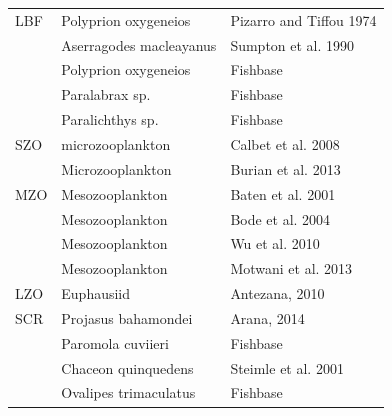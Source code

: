 \documentclass[11pt]{article}
\begin{document}
\begin{center}
\begin{tabular}{lll}
\hline
 LBF  &  Polyprion oxygeneios        &  Pizarro and Tiffou 1974                                                         \\
      &  Aserragodes macleayanus     &  Sumpton et al. 1990                                                             \\
      &  Polyprion oxygeneios        &  Fishbase                                                                        \\
      &  Paralabrax sp.              &  Fishbase                                                                        \\
      &  Paralichthys sp.            &  Fishbase                                                                        \\
\hline
 SZO  &  microzooplankton            &  Calbet et al. 2008                                                              \\
      &  Microzooplankton            &  Burian et al. 2013                                                              \\
\hline
 MZO  &  Mesozooplankton             &  Baten et al. 2001                                                               \\
      &  Mesozooplankton             &  Bode et al. 2004                                                                \\
      &  Mesozooplankton             &  Wu et al. 2010                                                                  \\
      &  Mesozooplankton             &  Motwani et al. 2013                                                             \\
\hline
 LZO  &  Euphausiid                  &  Antezana, 2010                                                                  \\
\hline
 SCR  &  Projasus bahamondei         &  Arana, 2014                                                                     \\
      &  Paromola cuviieri           &  Fishbase                                                                        \\
      &  Chaceon quinquedens         &  Steimle et al. 2001                                                             \\
      &  Ovalipes trimaculatus       &  Fishbase                                                                        \\

\end{tabular}
\end{center}
\end{document}
